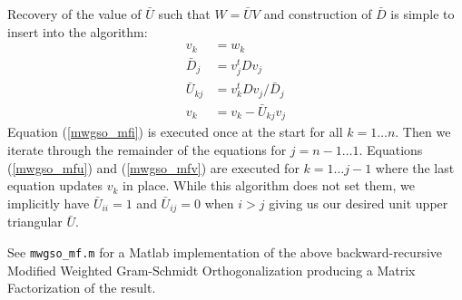 Recovery of the value of ${\bar U}$
such that $W = {\bar U} V$
and construction of ${\bar D}$
is simple to insert into the algorithm:
\begin{subequations}
\label{mwgso_mf}
\begin{align}
  v_k & = w_k
\label{mwgso_mfi}
\\
  {\bar D}_j & = v_j^t D v_j
\label{mwgso_mfd}
\\
  {\bar U}_{kj} & = v_k^t D v_j / {\bar D}_j
\label{mwgso_mfu}
\\
  v_k & = v_k - {\bar U}_{kj} v_j
\label{mwgso_mfv}
\end{align}
\end{subequations}
Equation (\ref{mwgso_mfi}) is executed once
at the start for all $k = 1 \dots n$.
Then we iterate through the remainder of the equations
for $j = n-1 \dots 1$.
Equations (\ref{mwgso_mfu}) and (\ref{mwgso_mfv})
are executed for $k = 1 \dots j-1$
where the last equation updates $v_k$ in place.
While this algorithm does not set them,
we implicitly have ${\bar U}_{ii} = 1$
and ${\bar U}_{ij} = 0$ when $i>j$
giving us our desired unit upper triangular ${\bar U}$.

See \verb|mwgso_mf.m| for a Matlab implementation
of the above backward-recursive Modified Weighted
Gram-Schmidt Orthogonalization
producing a Matrix Factorization of the result.


